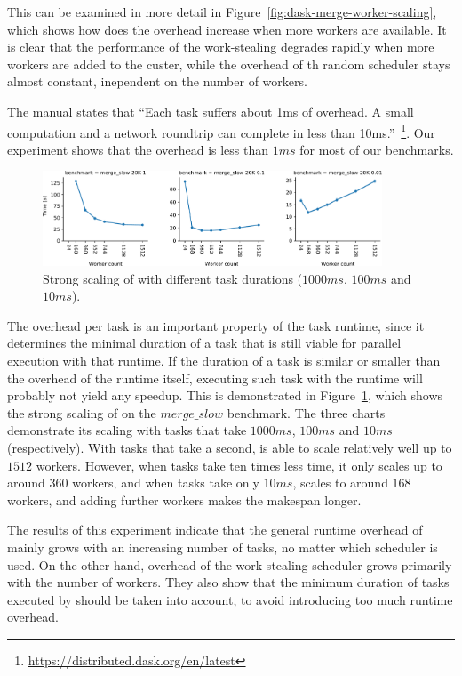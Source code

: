 This can be examined in more detail in Figure~\ref{fig:dask-merge-worker-scaling}, which shows how does the
overhead increase when more workers are available. It is clear that the performance of the
work-stealing degrades rapidly when more workers are added to the custer, while the overhead of th
random scheduler stays almost constant, inependent on the number of workers.

The \dask{} manual states that ``Each task suffers about 1ms of overhead. A
small computation and a network roundtrip can complete in less than
10ms.''~\footnote{\url{https://distributed.dask.org/en/latest}}. Our experiment shows that the overhead is less than
$1ms$ for most of our benchmarks.

\begin{figure}
	\centering
	\includegraphics[width=0.9\textwidth]{imgs/rsds/charts/dask-strong-scaling}
	\caption{Strong scaling of \dask{} with different task durations
	($1000ms$, $100ms$ and
	$10ms$).}
	\label{fig:dask-strong-scaling}
\end{figure}

The overhead per task is an important property of the task runtime, since it determines the minimal
duration of a task that is still viable for parallel execution with that runtime. If the duration
of a task is similar or smaller than the overhead of the runtime itself, executing such task with
the runtime will probably not yield any speedup. This is demonstrated in
Figure~\ref{fig:dask-strong-scaling}, which shows the strong scaling of \dask{}
on the $merge\_slow$ benchmark. The three charts demonstrate its scaling with tasks
that take $1000ms$, $100ms$ and $10ms$
(respectively). With tasks that take a second, \dask{} is able to scale
relatively well up to $1512$ workers. However, when tasks take ten times less
time, it only scales up to around $360$ workers, and when tasks take only
$10ms$, \dask{} scales to around $168$
workers, and adding further workers makes the makespan longer.

The results of this experiment indicate that the general runtime overhead of
\dask{} mainly grows with an increasing number of tasks, no matter which
scheduler is used. On the other hand, overhead of the work-stealing scheduler grows primarily with
the number of workers. They also show that the minimum duration of tasks executed by
\dask{} should be taken into account, to avoid introducing too much runtime
overhead.

